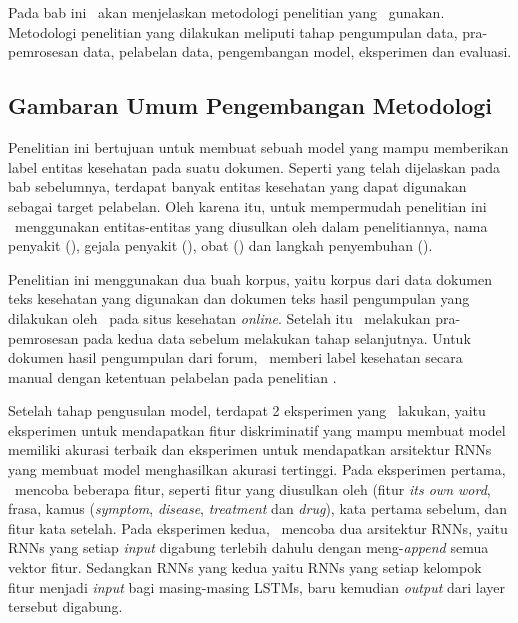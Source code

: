 \chapter{\babTiga}\label{bab:tiga}
Pada bab ini \saya~akan menjelaskan metodologi penelitian yang \saya~gunakan. Metodologi penelitian yang dilakukan meliputi tahap pengumpulan data, pra-pemrosesan data, pelabelan data, pengembangan model, eksperimen dan evaluasi.

\section{Gambaran Umum Pengembangan Metodologi}
Penelitian ini bertujuan untuk membuat sebuah model yang mampu memberikan label entitas kesehatan pada suatu dokumen. Seperti yang telah dijelaskan pada bab sebelumnya, terdapat banyak entitas kesehatan yang dapat digunakan sebagai target pelabelan. Oleh karena itu, untuk mempermudah penelitian ini \saya~menggunakan entitas-entitas yang diusulkan oleh \cite{skripsiKakRadit} dalam penelitiannya,  nama penyakit (\textit{\disease}), gejala penyakit (\textit{\symptom}), obat (\textit{\drug}) dan langkah penyembuhan (\textit{\treatment}).

Penelitian ini menggunakan dua buah korpus, yaitu korpus dari data dokumen teks kesehatan yang digunakan \cite{skripsiKakRadit} dan dokumen teks hasil pengumpulan yang dilakukan oleh \saya~pada situs kesehatan \textit{online}. Setelah itu \saya~melakukan pra-pemrosesan pada kedua data sebelum melakukan tahap selanjutnya. Untuk dokumen hasil pengumpulan dari forum, \saya~memberi label kesehatan secara manual dengan ketentuan pelabelan pada penelitian \cite{skripsiKakRadit}.

Setelah tahap pengusulan model, terdapat 2 eksperimen yang \saya~lakukan, yaitu eksperimen untuk mendapatkan fitur diskriminatif yang mampu membuat model memiliki akurasi terbaik dan eksperimen untuk mendapatkan arsitektur RNNs yang membuat model menghasilkan akurasi tertinggi. Pada eksperimen pertama, \saya~mencoba beberapa fitur, seperti fitur yang diusulkan oleh \cite{skripsiKakRadit} (fitur \textit{its own word}, frasa, kamus (\textit{symptom}, \textit{disease}, \textit{treatment} dan \textit{drug}), kata pertama sebelum, dan fitur kata setelah. Pada eksperimen kedua, \saya~mencoba dua arsitektur RNNs, yaitu RNNs yang setiap \textit{input} digabung terlebih dahulu dengan meng-\textit{append} semua vektor fitur. Sedangkan RNNs yang kedua yaitu RNNs yang setiap kelompok fitur menjadi \textit{input} bagi masing-masing LSTMs, baru kemudian \textit{output} dari layer tersebut digabung.

